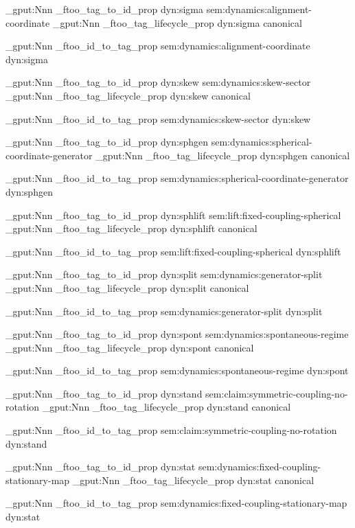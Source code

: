 \prop_gput:Nnn \g_ftoo_tag_to_id_prop { dyn:sigma } { sem:dynamics:alignment-coordinate }
\prop_gput:Nnn \g_ftoo_tag_lifecycle_prop { dyn:sigma } { canonical }

\prop_gput:Nnn \g_ftoo_id_to_tag_prop { sem:dynamics:alignment-coordinate } { dyn:sigma }


\prop_gput:Nnn \g_ftoo_tag_to_id_prop { dyn:skew } { sem:dynamics:skew-sector }
\prop_gput:Nnn \g_ftoo_tag_lifecycle_prop { dyn:skew } { canonical }

\prop_gput:Nnn \g_ftoo_id_to_tag_prop { sem:dynamics:skew-sector } { dyn:skew }


\prop_gput:Nnn \g_ftoo_tag_to_id_prop { dyn:sphgen } { sem:dynamics:spherical-coordinate-generator }
\prop_gput:Nnn \g_ftoo_tag_lifecycle_prop { dyn:sphgen } { canonical }

\prop_gput:Nnn \g_ftoo_id_to_tag_prop { sem:dynamics:spherical-coordinate-generator } { dyn:sphgen }


\prop_gput:Nnn \g_ftoo_tag_to_id_prop { dyn:sphlift } { sem:lift:fixed-coupling-spherical }
\prop_gput:Nnn \g_ftoo_tag_lifecycle_prop { dyn:sphlift } { canonical }

\prop_gput:Nnn \g_ftoo_id_to_tag_prop { sem:lift:fixed-coupling-spherical } { dyn:sphlift }


\prop_gput:Nnn \g_ftoo_tag_to_id_prop { dyn:split } { sem:dynamics:generator-split }
\prop_gput:Nnn \g_ftoo_tag_lifecycle_prop { dyn:split } { canonical }

\prop_gput:Nnn \g_ftoo_id_to_tag_prop { sem:dynamics:generator-split } { dyn:split }


\prop_gput:Nnn \g_ftoo_tag_to_id_prop { dyn:spont } { sem:dynamics:spontaneous-regime }
\prop_gput:Nnn \g_ftoo_tag_lifecycle_prop { dyn:spont } { canonical }

\prop_gput:Nnn \g_ftoo_id_to_tag_prop { sem:dynamics:spontaneous-regime } { dyn:spont }


\prop_gput:Nnn \g_ftoo_tag_to_id_prop { dyn:stand } { sem:claim:symmetric-coupling-no-rotation }
\prop_gput:Nnn \g_ftoo_tag_lifecycle_prop { dyn:stand } { canonical }

\prop_gput:Nnn \g_ftoo_id_to_tag_prop { sem:claim:symmetric-coupling-no-rotation } { dyn:stand }


\prop_gput:Nnn \g_ftoo_tag_to_id_prop { dyn:stat } { sem:dynamics:fixed-coupling-stationary-map }
\prop_gput:Nnn \g_ftoo_tag_lifecycle_prop { dyn:stat } { canonical }

\prop_gput:Nnn \g_ftoo_id_to_tag_prop { sem:dynamics:fixed-coupling-stationary-map } { dyn:stat }


